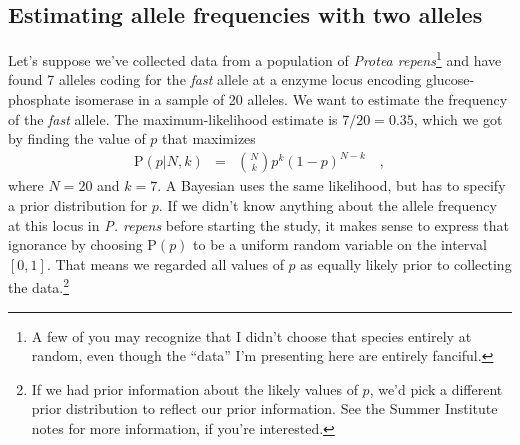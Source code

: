\subsection*{Estimating allele frequencies with two alleles}

Let's suppose we've collected data from a population of {\it Protea
  repens}\footnote{A few of you may recognize that I didn't choose
  that species entirely at random, even though the ``data'' I'm
  presenting here are entirely fanciful.} and have found 7 alleles
coding for the {\it fast\/} allele at a enzyme locus encoding
glucose-phosphate isomerase in a sample of 20 alleles. We want to
estimate the frequency of the {\it fast\/} allele. The
maximum-likelihood estimate is $7/20 = 0.35$, which we got by finding
the value of $p$ that maximizes
\begin{eqnarray*}
\mbox{P}(p|N,k) &=& {N \choose k} p^k (1-p)^{N-k} \quad ,
\end{eqnarray*}
where $N=20$ and $k=7$. A Bayesian uses the same likelihood, but has
to specify a prior distribution for $p$. If we didn't know anything
about the allele frequency at this locus in {\it P. repens} before
starting the study, it makes sense to express that ignorance by
choosing $\mbox{P}(p)$ to be a uniform random variable on the interval
$[0,1]$. That means we regarded all values of $p$ as equally likely
prior to collecting the data.\footnote{If we had prior information
  about the likely values of $p$, we'd pick a different prior
  distribution to reflect our prior information. See the Summer
  Institute notes for more information, if you're interested.}

